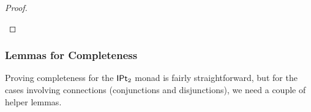 \documentclass[a4paper]{memoir}
\begin{document}
\begin{proof}
\begin{itemize}
%		
	\end{itemize}
\end{proof}

\subsubsection{Lemmas for Completeness} \label{sec:jetcubes:calculus:lemmas}
Proving completeness for the ${\mathsf{IPt}_2}$ monad is fairly straightforward,
but for the cases involving connections (conjunctions and disjunctions), we need a couple of helper lemmas.
\end{document}
